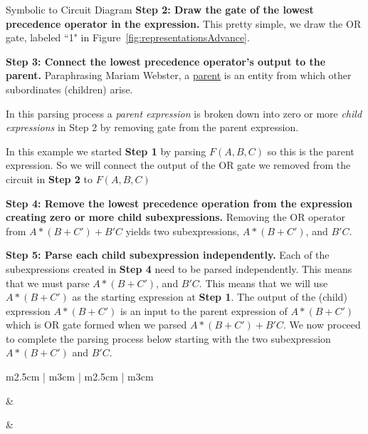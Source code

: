 \begin{process}{Symbolic to Circuit Diagram}
\textbf{Step 2: Draw the gate of the lowest precedence operator in the expression.}
This pretty simple, we draw the OR gate, labeled ``1" in
Figure~\ref{fig:representationsAdvance}.

\textbf{Step 3: Connect the lowest precedence operator's output to the parent.}
Paraphrasing Mariam Webster, a
\href{https://merriam-webster.com/dictionary/parent}{parent} 
is an entity from which other subordinates (children) arise.

In this parsing process a \textit{parent expression} 
is broken down into zero or more \textit{child expressions} 
in Step 2 by removing gate from the parent expression.

In this example we started \textbf{Step 1} by parsing
$F(A,B,C)$ so this is the parent expression.  So we will connect the output
of the OR gate we removed from the circuit in \textbf{Step 2} to $F(A,B,C)$

\textbf {Step 4: Remove the lowest precedence operation from the expression
creating zero or more child subexpressions.}
Removing the OR operator from $A*(B+C')+B'C$ yields two subexpressions,
$A*(B+C')$, and $B'C$.

\textbf {Step 5: Parse each child subexpression independently.}
Each of the subexpressions created in \textbf{Step 4} need to be parsed independently.
This means that we must parse $A*(B+C')$, and $B'C$.  This means that we will
use $A*(B+C')$ as the starting expression at \textbf{Step 1}.  The output of the
(child) expression $A*(B+C')$ is an input to the parent expression of $A*(B+C')$
which is OR gate formed when we parsed $A*(B+C')+B'C$.  We now proceed to
complete the parsing process below starting with the two subexpression
$A*(B+C')$    and $B'C$.
\vspace{0.2cm}

\begin{tabular}{m{2.5cm} | m{3cm} | m{2.5cm} | m{3cm}}

        &      \\ \hline

  &
 \\ \hline


\end{tabular}
\end{process}

